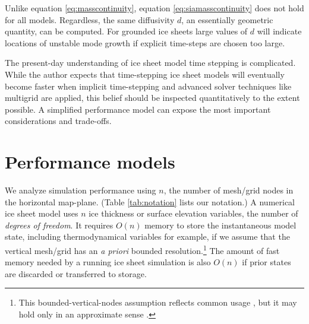 \documentclass[twocolumn,letterpaper]{igs}
\begin{document}
Unlike equation \eqref{eq:masscontinuity}, equation \eqref{eq:siamasscontinuity} does not hold for all models.  Regardless, the same diffusivity $d$, an essentially geometric quantity, can be computed.  For grounded ice sheets large values of $d$ will indicate locations of unstable mode growth if explicit time-steps are chosen too large.  

The present-day understanding of ice sheet model time stepping is complicated.  While the author expects that time-stepping ice sheet models will eventually become faster when implicit time-stepping and advanced solver techniques like multigrid \citep{Briggsetal2000} are applied, this belief should be inspected quantitatively to the extent possible.  A simplified performance model can expose the most important considerations and trade-offs.

\section{Performance models}

We analyze simulation performance using $n$, the number of mesh/grid nodes in the horizontal map-plane.  (Table \ref{tab:notation} lists our notation.)  A numerical ice sheet model uses $n$ ice thickness or surface elevation variables, the number of \emph{degrees of freedom}.  It requires $O(n)$ memory to store the instantaneous model state, including thermodynamical variables for example, if we assume that the vertical mesh/grid has an \emph{a priori} bounded resolution.\footnote{This bounded-vertical-nodes assumption reflects common usage \citep[for example]{Aschwandenetal2019,Brinkerhoffetal2017,Hoffmanetal2018}, but it may hold only in an approximate sense \citep{IsaacStadlerGhattas2015}.}  The amount of fast memory needed by a running ice sheet simulation is also $O(n)$ if prior states are discarded or transferred to storage.
\end{document}
